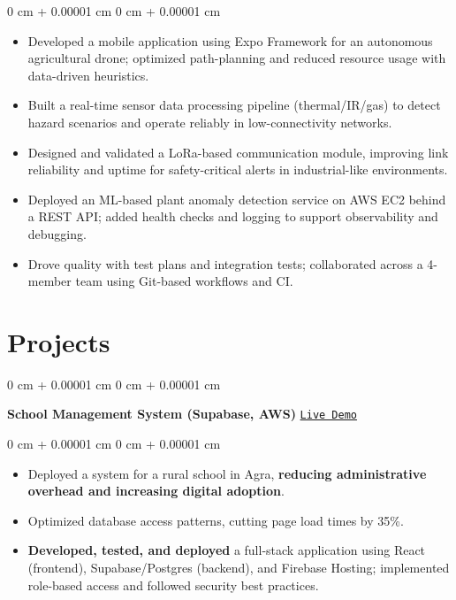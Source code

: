 \documentclass[10pt, letterpaper]{article}
\newenvironment{highlights}{ \begin{itemize}[ topsep=0.10 cm, parsep=0.10 cm, partopsep=0pt,
itemsep=0pt, leftmargin=0 cm + 10pt ] }{ \end{itemize} } %
\newenvironment{onecolentry}{ \begin{adjustwidth}{ 0 cm + 0.00001 cm }{ 0 cm + 0.00001 cm }
}{ \end{adjustwidth} } %
\begin{document}
\begin{onecolentry}
	\begin{highlights}
	\vspace{0.10 cm}
		\item Developed a mobile application using Expo Framework for an autonomous agricultural drone; optimized path-planning and reduced resource usage with data-driven heuristics. \\
		\item Built a real-time sensor data processing pipeline (thermal/IR/gas) to detect hazard scenarios and operate reliably in low-connectivity networks. \\
		\item Designed and validated a LoRa-based communication module, improving link reliability and uptime for safety-critical alerts in industrial-like environments. \\
		\item Deployed an ML-based plant anomaly detection service on AWS EC2 behind a REST API; added health checks and logging to support observability and debugging. \\
		\item Drove quality with test plans and integration tests; collaborated across a 4-member team using Git-based workflows and CI.
	\end{highlights}
\end{onecolentry}

	\section{Projects}

\begin{onecolentry}
		\textbf{School Management System (Supabase, AWS)} \hfill \href{https://stgdconventschool.com}{\texttt{Live Demo}}
\end{onecolentry}

\begin{onecolentry}
	\begin{highlights}
		\vspace{0.1cm}
		\item Deployed a system for a rural school in Agra, \textbf{reducing administrative overhead and increasing digital adoption}. \\
		\item Optimized database access patterns, cutting page load times by 35\%. \\
		\item \textbf{Developed, tested, and deployed} a full-stack application using React (frontend), Supabase/Postgres (backend), and Firebase Hosting; implemented role-based access and followed security best practices.
	\end{highlights}
\end{onecolentry}
\end{document}
